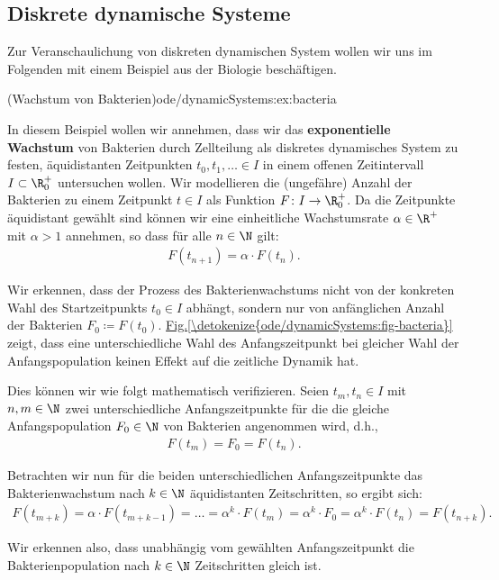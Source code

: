 \documentclass[letterpaper,10pt,english]{jupyterBook}
\begin{document}
\subsection{Diskrete dynamische Systeme}
\label{\detokenize{ode/dynamicSystems:diskrete-dynamische-systeme}}
\par
Zur Veranschaulichung von diskreten dynamischen System wollen wir uns im Folgenden mit einem Beispiel aus der Biologie beschäftigen.
\begin{example}{(Wachstum von Bakterien)}{ode/dynamicSystems:ex:bacteria}



\par
In diesem Beispiel wollen wir annehmen, dass wir das \textbf{exponentielle Wachstum} von Bakterien durch Zellteilung als diskretes dynamisches System zu festen, äquidistanten Zeitpunkten \(t_0, t_1, \ldots \in I\) in einem offenen Zeitintervall \(I\subset\R^+_0\) untersuchen wollen.
Wir modellieren die (ungefähre) Anzahl der Bakterien zu einem Zeitpunkt \(t \in I\) als Funktion \(F \colon I \rightarrow \R_0^+\).
Da die Zeitpunkte äquidistant gewählt sind können wir eine einheitliche Wachstumsrate \(\alpha \in \R^+\) mit \(\alpha > 1\) annehmen, so dass für alle \(n \in \N\) gilt:
\begin{align*}
F(t_{n+1}) = \alpha \cdot F(t_n).
\end{align*}
\par
Wir erkennen, dass der Prozess des Bakterienwachstums nicht von der konkreten Wahl des Startzeitpunkts \(t_0 \in I\) abhängt, sondern nur von anfänglichen Anzahl der Bakterien \(F_0 \coloneqq F(t_0)\). \hyperref[\detokenize{ode/dynamicSystems:fig-bacteria}]{Fig.\@ \ref{\detokenize{ode/dynamicSystems:fig-bacteria}}} zeigt, dass eine unterschiedliche Wahl des Anfangszeitpunkt bei gleicher Wahl der Anfangspopulation keinen Effekt auf die zeitliche Dynamik hat.

\par
Dies können wir wie folgt mathematisch verifizieren. Seien \(t_m, t_n \in I\) mit \(n,m \in \N\) zwei unterschiedliche Anfangszeitpunkte für die die gleiche Anfangspopulation \(F_0 \in \N\) von Bakterien angenommen wird, d.h.,
\begin{align*}
F(t_m) = F_0 = F(t_n).
\end{align*}
\par
Betrachten wir nun für die beiden unterschiedlichen Anfangszeitpunkte das Bakterienwachstum nach \(k \in \N\) äquidistanten Zeitschritten, so ergibt sich:
\begin{align*}
F(t_{m+k}) = \alpha \cdot F(t_{m+k-1}) = \ldots = \alpha^k \cdot F(t_{m}) = \alpha^k \cdot F_0 = \alpha^k \cdot F(t_n) = F(t_{n+k}).
\end{align*}
\par
Wir erkennen also, dass unabhängig vom gewählten Anfangszeitpunkt die Bakterienpopulation nach \(k \in \N\) Zeitschritten gleich ist.
\end{example}
\end{document}
